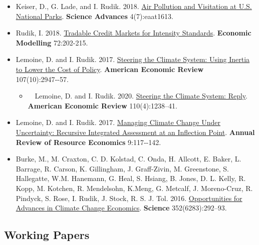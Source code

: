 \documentclass[12pt]{res} %
\begin{document}
\begin{resume}
\begin{itemize}
	\item[] Keiser, D., G. Lade, and I. Rudik. 2018. \href{http://advances.sciencemag.org/content/4/7/eaat1613}{Air Pollution and Visitation at U.S. National Parks}. \textbf{Science Advances} 4(7):eaat1613.
	\item[] Rudik, I. 2018. \href{https://www.sciencedirect.com/science/article/pii/S0264999317315651}{Tradable Credit Markets for Intensity Standards}. \textbf{Economic Modelling} 72:202-215.
	\item[] Lemoine, D. and I. Rudik. 2017.  \href{http://papers.ssrn.com/sol3/papers.cfm?abstract_id=2443594}{Steering the Climate System: Using Inertia to Lower the Cost of Policy}. \textbf{American Economic Review} 107(10):2947‐-57.
	\begin{itemize}
		\item[] \,\,\,\, Lemoine, D. and I. Rudik. 2020.  \href{http://papers.ssrn.com/sol3/papers.cfm?abstract_id=2443594}{Steering the Climate System: Reply}. \textbf{American Economic Review} 110(4):1238--41.
	\end{itemize}
	\item[] Lemoine, D. and I. Rudik. 2017. \href{https://papers.ssrn.com/sol3/papers.cfm?abstract_id=2862211}{Managing Climate Change Under Uncertainty: Recursive Integrated Assessment at an Inflection Point}.  \textbf{Annual Review of Resource Economics} 9:117‐-142.
	\item[]  Burke, M., M. Craxton, C. D. Kolstad, C. Onda, H. Allcott, E. Baker, L. Barrage, R. Carson, K. Gillingham, J. Graff-Zivin, M. Greenstone, S. Hallegatte, W.M. Hanemann, G. Heal, S. Hsiang, B. Jones, D. L. Kelly, R. Kopp, M. Kotchen, R. Mendelsohn, K.Meng, G. Metcalf, J. Moreno-Cruz, R. Pindyck, S. Rose, I. Rudik, J. Stock, R. S. J. Tol. 2016. \href{http://science.sciencemag.org/content/352/6283/292.abstract}{Opportunities for Advances in Climate Change Economics}. \textbf{Science} 352(6283):292--93.
\end{itemize} 


\vspace{-.2in}


\subsection{Working Papers}


\end{resume}
\end{document}

